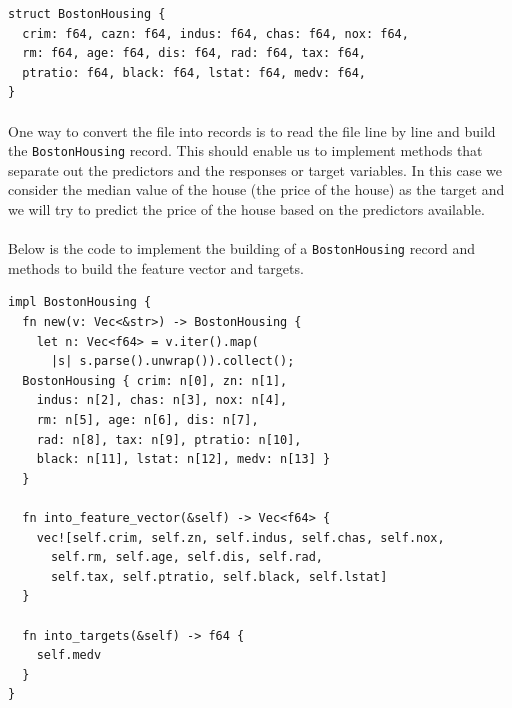 \documentclass{book}
\begin{document}
\begin{lstlisting}[caption={chapter2\\/ml\\-utils\\/src\\/datasets\\.rs}]
struct BostonHousing {
  crim: f64, cazn: f64, indus: f64, chas: f64, nox: f64,
  rm: f64, age: f64, dis: f64, rad: f64, tax: f64,
  ptratio: f64, black: f64, lstat: f64, medv: f64,
}
\end{lstlisting}

\paragraph{}%
One way to convert the file into records is to read the file line by line and build the \lstinline{BostonHousing} record. This should enable us to implement methods that separate out the predictors and the responses or target variables. In this case we consider the median value of the house (the price of the house) as the target and we will try to predict the price of the house based on the predictors available.
\label{par:}

\paragraph{}%
Below is the code to implement the building of a \lstinline{BostonHousing} record and methods to build the feature vector and targets.
\label{par:}

\begin{lstlisting}[caption={chapter2\\/ml\\-utils\\/src\\/datasets\\.rs}]
impl BostonHousing {
  fn new(v: Vec<&str>) -> BostonHousing {
    let n: Vec<f64> = v.iter().map(
      |s| s.parse().unwrap()).collect();
  BostonHousing { crim: n[0], zn: n[1],
    indus: n[2], chas: n[3], nox: n[4],
    rm: n[5], age: n[6], dis: n[7],
    rad: n[8], tax: n[9], ptratio: n[10],
    black: n[11], lstat: n[12], medv: n[13] }
  }

  fn into_feature_vector(&self) -> Vec<f64> {
    vec![self.crim, self.zn, self.indus, self.chas, self.nox,
      self.rm, self.age, self.dis, self.rad,
      self.tax, self.ptratio, self.black, self.lstat]
  }

  fn into_targets(&self) -> f64 {
    self.medv
  }
}
\end{lstlisting}
\end{document}
